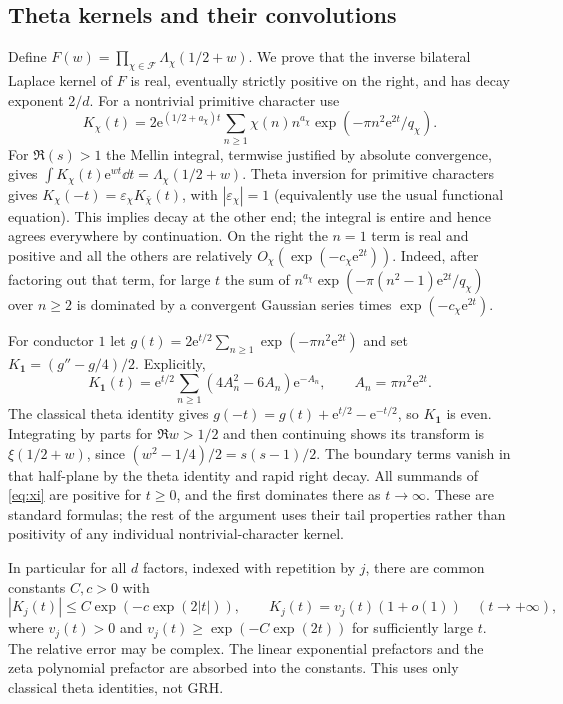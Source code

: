 \documentclass[11pt]{article}
\theoremstyle{remark}\newtheorem{remark}[theorem]{Remark}
\newcommand{\ee}{\mathrm e}\newcommand{\abs}[1]{\lvert#1\rvert}
\newcommand{\spec}{\mathcal F}
\begin{document}
\subsection{Theta kernels and their convolutions}
Define $F(w)=\prod_{\chi\in\spec}\Lambda_\chi(1/2+w)$. We prove that the inverse bilateral Laplace kernel of $F$ is real, eventually strictly positive on the right, and has decay exponent $2/d$. For a nontrivial primitive character use
\begin{equation}\label{eq:theta}
 K_\chi(t)=2\ee^{(1/2+a_\chi)t}\sum_{n\ge1}\chi(n)n^{a_\chi}\exp(-\pi n^2\ee^{2t}/q_\chi).
\end{equation}
For $\Re(s)>1$ the Mellin integral, termwise justified by absolute convergence, gives $\int K_\chi(t)\ee^{wt}\dd t=\Lambda_\chi(1/2+w)$. Theta inversion for primitive characters gives $K_\chi(-t)=\varepsilon_\chi K_{\bar\chi}(t)$, with $|\varepsilon_\chi|=1$ (equivalently use the usual functional equation). This implies decay at the other end; the integral is entire and hence agrees everywhere by continuation. On the right the $n=1$ term is real and positive and all the others are relatively $O_\chi(\exp(-c_\chi\ee^{2t}))$. Indeed, after factoring out that term, for large $t$ the sum of $n^{a_\chi}\exp(-\pi(n^2-1)\ee^{2t}/q_\chi)$ over $n\ge2$ is dominated by a convergent Gaussian series times $\exp(-c_\chi\ee^{2t})$.

For conductor $1$ let $g(t)=2\ee^{t/2}\sum_{n\ge1}\exp(-\pi n^2\ee^{2t})$ and set $K_{\mathbf1}=(g''-g/4)/2$. Explicitly,
\begin{equation}\label{eq:xi}
 K_{\mathbf1}(t)=\ee^{t/2}\sum_{n\ge1}(4A_n^2-6A_n)\ee^{-A_n},\qquad A_n=\pi n^2\ee^{2t}.
\end{equation}
The classical theta identity gives $g(-t)=g(t)+\ee^{t/2}-\ee^{-t/2}$, so $K_{\mathbf1}$ is even. Integrating by parts for $\Re w>1/2$ and then continuing shows its transform is $\xi(1/2+w)$, since $(w^2-1/4)/2=s(s-1)/2$. The boundary terms vanish in that half-plane by the theta identity and rapid right decay. All summands of \eqref{eq:xi} are positive for $t\ge0$, and the first dominates there as $t\to\infty$. These are standard formulas; the rest of the argument uses their tail properties rather than positivity of any individual nontrivial-character kernel.

In particular for all $d$ factors, indexed with repetition by $j$, there are common constants $C,c>0$ with
\begin{equation}\label{eq:Kbound}
 |K_j(t)|\le C\exp(-c\exp(2|t|)),\qquad
 K_j(t)=v_j(t)(1+o(1))\quad(t\to+\infty),
\end{equation}
where $v_j(t)>0$ and $v_j(t)\ge\exp(-C\exp(2t))$ for sufficiently large $t$. The relative error may be complex. The linear exponential prefactors and the zeta polynomial prefactor are absorbed into the constants. This uses only classical theta identities, not GRH.
\end{document}
